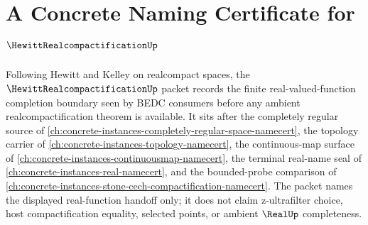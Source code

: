 \chapter{A Concrete Naming Certificate for $\HewittRealcompactificationUp$}
\label{ch:concrete-instances-hewitt-realcompactification-namecert}

Following Hewitt and Kelley on realcompact spaces, the $\HewittRealcompactificationUp$ packet records the finite real-valued-function completion boundary seen by BEDC consumers before any ambient realcompactification theorem is available. It sits after the completely regular source of \autoref{ch:concrete-instances-completely-regular-space-namecert}, the topology carrier of \autoref{ch:concrete-instances-topology-namecert}, the continuous-map surface of \autoref{ch:concrete-instances-continuousmap-namecert}, the terminal real-name seal of \autoref{ch:concrete-instances-real-namecert}, and the bounded-probe comparison of \autoref{ch:concrete-instances-stone-cech-compactification-namecert}. The packet names the displayed real-function handoff only; it does not claim z-ultrafilter choice, host compactification equality, selected points, or ambient $\RealUp$ completeness.

